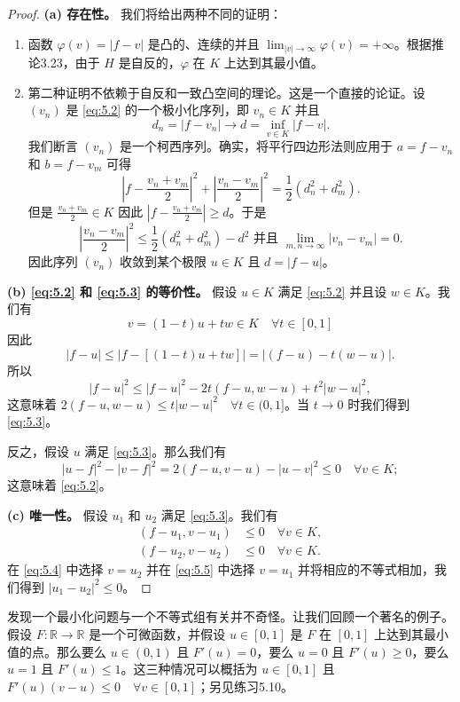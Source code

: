 \begin{proof}
\textbf{(a) 存在性。} 我们将给出两种不同的证明：
\begin{enumerate}
    \item 函数 $\varphi(v) = |f-v|$ 是凸的、连续的并且 $\lim_{|v|\to\infty} \varphi(v) = +\infty$。根据推论3.23，由于 $H$ 是自反的，$\varphi$ 在 $K$ 上达到其最小值。
    \item 第二种证明不依赖于自反和一致凸空间的理论。这是一个直接的论证。设 $(v_n)$ 是 \eqref{eq:5.2} 的一个极小化序列，即 $v_n \in K$ 并且
    \[ d_n = |f-v_n| \to d = \inf_{v \in K} |f-v|. \]
    我们断言 $(v_n)$ 是一个柯西序列。确实，将平行四边形法则应用于 $a = f-v_n$ 和 $b = f-v_m$ 可得
    \[
    \left|f - \frac{v_n+v_m}{2}\right|^2 + \left|\frac{v_n-v_m}{2}\right|^2 = \frac{1}{2}(d_n^2+d_m^2).
    \]
    但是 $\frac{v_n+v_m}{2} \in K$ 因此 $\left|f - \frac{v_n+v_m}{2}\right| \ge d$。于是
    \[
    \left|\frac{v_n-v_m}{2}\right|^2 \le \frac{1}{2}(d_n^2+d_m^2) - d^2 \text{ 并且 } \lim_{m,n\to\infty} |v_n-v_m|=0.
    \]
    因此序列 $(v_n)$ 收敛到某个极限 $u \in K$ 且 $d = |f-u|$。
\end{enumerate}
\textbf{(b) \eqref{eq:5.2} 和 \eqref{eq:5.3} 的等价性。} 假设 $u \in K$ 满足 \eqref{eq:5.2} 并且设 $w \in K$。我们有
\[ v = (1-t)u + tw \in K \quad \forall t \in [0,1] \]
因此
\[ |f-u| \le |f - [(1-t)u+tw]| = |(f-u) - t(w-u)|. \]
所以
\[ |f-u|^2 \le |f-u|^2 - 2t(f-u, w-u) + t^2|w-u|^2, \]
这意味着 $2(f-u, w-u) \le t|w-u|^2 \quad \forall t \in (0,1]$。当 $t \to 0$ 时我们得到 \eqref{eq:5.3}。

反之，假设 $u$ 满足 \eqref{eq:5.3}。那么我们有
\[ |u-f|^2 - |v-f|^2 = 2(f-u,v-u) - |u-v|^2 \le 0 \quad \forall v \in K; \]
这意味着 \eqref{eq:5.2}。

\textbf{(c) 唯一性。} 假设 $u_1$ 和 $u_2$ 满足 \eqref{eq:5.3}。我们有
\begin{align}
(f-u_1, v-u_1) &\le 0 \quad \forall v \in K, \label{eq:5.4} \\
(f-u_2, v-u_2) &\le 0 \quad \forall v \in K. \label{eq:5.5}
\end{align}
在 \eqref{eq:5.4} 中选择 $v=u_2$ 并在 \eqref{eq:5.5} 中选择 $v=u_1$ 并将相应的不等式相加，我们得到 $|u_1-u_2|^2 \le 0$。
\end{proof}

\begin{remark}
发现一个最小化问题与一个不等式组有关并不奇怪。让我们回顾一个著名的例子。假设 $F:\mathbb{R} \to \mathbb{R}$ 是一个可微函数，并假设 $u \in [0,1]$ 是 $F$ 在 $[0,1]$ 上达到其最小值的点。那么要么 $u \in (0,1)$ 且 $F'(u)=0$，要么 $u=0$ 且 $F'(u) \ge 0$，要么 $u=1$ 且 $F'(u) \le 1$。这三种情况可以概括为 $u \in [0,1]$ 且 $F'(u)(v-u) \le 0 \quad \forall v \in [0,1]$；另见练习5.10。
\end{remark}

